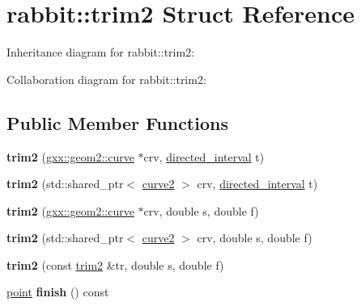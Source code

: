 \hypertarget{structrabbit_1_1trim2}{}\section{rabbit\+:\+:trim2 Struct Reference}
\label{structrabbit_1_1trim2}


Inheritance diagram for rabbit\+:\+:trim2\+:


Collaboration diagram for rabbit\+:\+:trim2\+:
\subsection*{Public Member Functions}
\begin{DoxyCompactItemize}
\item 
{\bfseries trim2} (\hyperlink{classgxx_1_1geom2_1_1curve}{gxx\+::geom2\+::curve} $\ast$crv, \hyperlink{structgxx_1_1math_1_1directed__interval}{directed\+\_\+interval} t)\hypertarget{structrabbit_1_1trim2_a51d0f1abbfbeef4913e24e9623d89c3f}{}\label{structrabbit_1_1trim2_a51d0f1abbfbeef4913e24e9623d89c3f}

\item 
{\bfseries trim2} (std\+::shared\+\_\+ptr$<$ \hyperlink{classgxx_1_1geom2_1_1curve}{curve2} $>$ crv, \hyperlink{structgxx_1_1math_1_1directed__interval}{directed\+\_\+interval} t)\hypertarget{structrabbit_1_1trim2_ae3f3a3a720ee6f72dd95f94da2bf7dd7}{}\label{structrabbit_1_1trim2_ae3f3a3a720ee6f72dd95f94da2bf7dd7}

\item 
{\bfseries trim2} (\hyperlink{classgxx_1_1geom2_1_1curve}{gxx\+::geom2\+::curve} $\ast$crv, double s, double f)\hypertarget{structrabbit_1_1trim2_afa89139dae6c5a62169c09da6bc80e47}{}\label{structrabbit_1_1trim2_afa89139dae6c5a62169c09da6bc80e47}

\item 
{\bfseries trim2} (std\+::shared\+\_\+ptr$<$ \hyperlink{classgxx_1_1geom2_1_1curve}{curve2} $>$ crv, double s, double f)\hypertarget{structrabbit_1_1trim2_a2e267fcd8611640b3be9bc1204980900}{}\label{structrabbit_1_1trim2_a2e267fcd8611640b3be9bc1204980900}

\item 
{\bfseries trim2} (const \hyperlink{structrabbit_1_1trim2}{trim2} \&tr, double s, double f)\hypertarget{structrabbit_1_1trim2_a801de15b482491ab24ab4f687e927d27}{}\label{structrabbit_1_1trim2_a801de15b482491ab24ab4f687e927d27}

\item 
\hyperlink{classmalgo_1_1vector2}{point} {\bfseries finish} () const \hypertarget{structrabbit_1_1trim2_a8a40da029d9e3b321169905806ed07c0}{}\label{structrabbit_1_1trim2_a8a40da029d9e3b321169905806ed07c0}


\end{DoxyCompactItemize}
